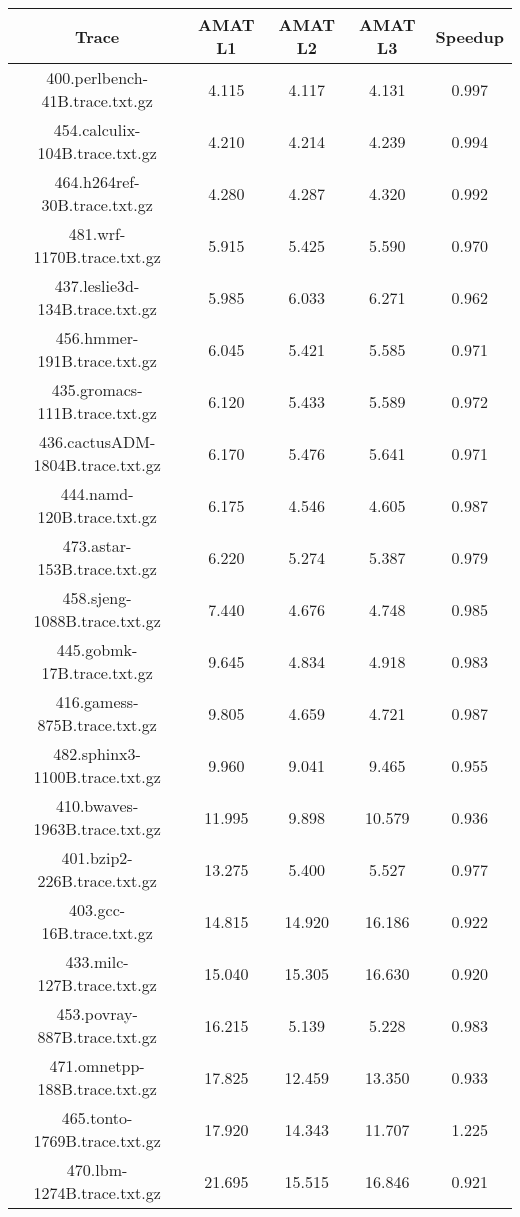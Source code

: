 \begin{table}[H]
\centering
\begin{tabular}{|c|c|c|c|c|}
\hline
Trace & AMAT L1 & AMAT L2 & AMAT L3 & Speedup\\
\hline
400.perlbench-41B.trace.txt.gz & 4.115 & 4.117 &  4.131 & 0.997\\\hline
454.calculix-104B.trace.txt.gz & 4.210 & 4.214 &  4.239 & 0.994\\\hline
464.h264ref-30B.trace.txt.gz & 4.280 & 4.287 &  4.320 & 0.992\\\hline
481.wrf-1170B.trace.txt.gz & 5.915 & 5.425 &  5.590 & 0.970\\\hline
437.leslie3d-134B.trace.txt.gz & 5.985 & 6.033 &  6.271 & 0.962\\\hline
456.hmmer-191B.trace.txt.gz & 6.045 & 5.421 &  5.585 & 0.971\\\hline
435.gromacs-111B.trace.txt.gz & 6.120 & 5.433 &  5.589 & 0.972\\\hline
436.cactusADM-1804B.trace.txt.gz & 6.170 & 5.476 &  5.641 & 0.971\\\hline
444.namd-120B.trace.txt.gz & 6.175 & 4.546 &  4.605 & 0.987\\\hline
473.astar-153B.trace.txt.gz & 6.220 & 5.274 &  5.387 & 0.979\\\hline
458.sjeng-1088B.trace.txt.gz & 7.440 & 4.676 &  4.748 & 0.985\\\hline
445.gobmk-17B.trace.txt.gz & 9.645 & 4.834 &  4.918 & 0.983\\\hline
416.gamess-875B.trace.txt.gz & 9.805 & 4.659 &  4.721 & 0.987\\\hline
482.sphinx3-1100B.trace.txt.gz & 9.960 & 9.041 &  9.465 & 0.955\\\hline
410.bwaves-1963B.trace.txt.gz & 11.995 & 9.898 &  10.579 & 0.936\\\hline
401.bzip2-226B.trace.txt.gz & 13.275 & 5.400 &  5.527 & 0.977\\\hline
403.gcc-16B.trace.txt.gz & 14.815 & 14.920 &  16.186 & 0.922\\\hline
433.milc-127B.trace.txt.gz & 15.040 & 15.305 &  16.630 & 0.920\\\hline
453.povray-887B.trace.txt.gz & 16.215 & 5.139 &  5.228 & 0.983\\\hline
471.omnetpp-188B.trace.txt.gz & 17.825 & 12.459 &  13.350 & 0.933\\\hline
465.tonto-1769B.trace.txt.gz & 17.920 & 14.343 &  11.707 & 1.225\\\hline
470.lbm-1274B.trace.txt.gz & 21.695 & 15.515 &  16.846 & 0.921\\\hline

\end{tabular}
\end{table}
